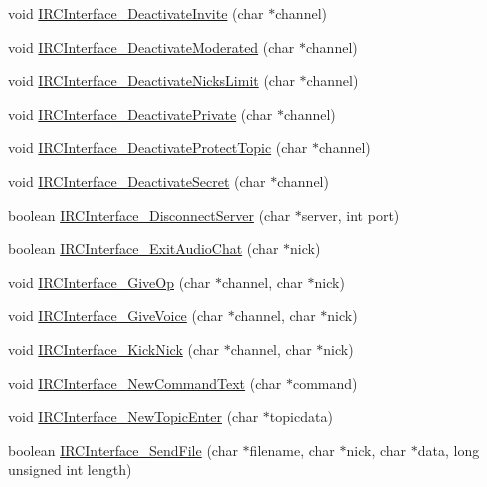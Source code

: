 \begin{DoxyCompactItemize}
\item 
void \hyperlink{G-2313-06-P2__client_8c_a9ba4e98a3729737aa63ebec54ba4e894}{I\+R\+C\+Interface\+\_\+\+Deactivate\+Invite} (char $\ast$channel)
\item 
void \hyperlink{G-2313-06-P2__client_8c_ab760e8144b38f6c14bd809d157cee5d4}{I\+R\+C\+Interface\+\_\+\+Deactivate\+Moderated} (char $\ast$channel)
\item 
void \hyperlink{G-2313-06-P2__client_8c_a92c8cfbe2e14e19277e1c97d11719e80}{I\+R\+C\+Interface\+\_\+\+Deactivate\+Nicks\+Limit} (char $\ast$channel)
\item 
void \hyperlink{G-2313-06-P2__client_8c_a8a6141803691ba327f11ba763ad075d4}{I\+R\+C\+Interface\+\_\+\+Deactivate\+Private} (char $\ast$channel)
\item 
void \hyperlink{G-2313-06-P2__client_8c_a5a57541a950f8c2c40b4b44c32b28ed9}{I\+R\+C\+Interface\+\_\+\+Deactivate\+Protect\+Topic} (char $\ast$channel)
\item 
void \hyperlink{G-2313-06-P2__client_8c_a4956427664cabc7d5b2bd1589a207324}{I\+R\+C\+Interface\+\_\+\+Deactivate\+Secret} (char $\ast$channel)
\item 
boolean \hyperlink{G-2313-06-P2__client_8c_a8bf0424ef7f845be79a056e9aed56fe2}{I\+R\+C\+Interface\+\_\+\+Disconnect\+Server} (char $\ast$server, int port)
\item 
boolean \hyperlink{G-2313-06-P2__client_8c_ab431412191716f751461f94d613ffdab}{I\+R\+C\+Interface\+\_\+\+Exit\+Audio\+Chat} (char $\ast$nick)
\item 
void \hyperlink{G-2313-06-P2__client_8c_ae075029bb55e8b995f22beb0810674f4}{I\+R\+C\+Interface\+\_\+\+Give\+Op} (char $\ast$channel, char $\ast$nick)
\item 
void \hyperlink{G-2313-06-P2__client_8c_ae9effb4bdaf4a2cdf2dd9edbeb90b430}{I\+R\+C\+Interface\+\_\+\+Give\+Voice} (char $\ast$channel, char $\ast$nick)
\item 
void \hyperlink{G-2313-06-P2__client_8c_a7adfea400a96160585f86179bafb055f}{I\+R\+C\+Interface\+\_\+\+Kick\+Nick} (char $\ast$channel, char $\ast$nick)
\item 
void \hyperlink{G-2313-06-P2__client_8c_a214e10b19c8be028fb35d2a7abf3f798}{I\+R\+C\+Interface\+\_\+\+New\+Command\+Text} (char $\ast$command)
\item 
void \hyperlink{G-2313-06-P2__client_8c_a080cf34ff506481737f6d08af60ca92b}{I\+R\+C\+Interface\+\_\+\+New\+Topic\+Enter} (char $\ast$topicdata)
\item 
boolean \hyperlink{G-2313-06-P2__client_8c_a100f1c87bb3b399a7284e62dd2e6172a}{I\+R\+C\+Interface\+\_\+\+Send\+File} (char $\ast$filename, char $\ast$nick, char $\ast$data, long unsigned int length)

\end{DoxyCompactItemize}
